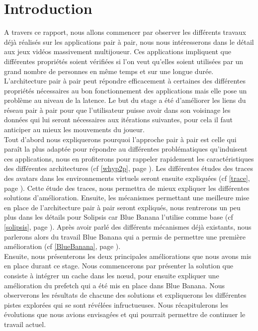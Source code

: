 \section{Introduction}
	A travers ce rapport, nous allons commencer par observer les différents travaux déjà réalisés sur les applications pair à pair, nous nous intéresserons dans le détail aux jeux vidéos massivement multijoueur. Ces applications impliquent que différentes propriétés soient vérifiées si l'on veut qu'elles soient utilisées par un grand nombre de personnes en même temps et sur une longue durée. L'architecture pair à pair peut répondre efficacement à certaines des différentes propriétés nécessaires au bon fonctionnement des applications mais elle pose un problème au niveau de la latence. Le but du stage a été d'améliorer les liens du réseau pair à pair pour que l'utilisateur puisse avoir dans son voisinage les données qui lui seront nécessaires aux itérations suivantes, pour cela il faut anticiper au mieux les mouvements du joueur.\\

	Tout d'abord nous expliquerons pourquoi l'approche pair à pair est celle qui paraît la plus adaptée pour répondre au différentes problématiques qu'induisent ces applications, nous en profiterons pour rappeler rapidement les caractéristiques des différentes architectures (cf \ref{whyp2p}, page \pageref{whyp2p}). Les différentes études des traces des avatars dans les environnements virtuels seront ensuite expliquées (cf \ref{trace}, page \pageref{trace}). Cette étude des traces, nous permettra de mieux expliquer les différentes solutions d'amélioration. Ensuite, les mécanismes permettant une meilleure mise en place de l'architecture pair à pair seront expliqués, nous rentrerons un peu plus dans les détails pour Solipsis car Blue Banana l'utilise comme base (cf \ref{solipsis}, page \pageref{solipsis}). Après avoir parlé des différents mécanismes déjà existants, nous parlerons alors du travail Blue Banana qui a permis de permettre une première amélioration (cf \ref{BlueBanana}, page \pageref{BlueBanana}). \\
	
	Ensuite, nous présenterons les deux principales améliorations que nous avons mis en place durant ce stage. Nous commencerons par présenter la solution que consiste à intégrer un cache dans les nœud, pour ensuite expliquer une amélioration du prefetch qui a été mis en place dans Blue Banana. Nous observerons les résultats de chacune des solutions et expliquerons les différentes pistes explorées qui se sont révélées infructueuses. Nous récapitulerons les évolutions que nous avions envisagées et qui pourrait permettre de continuer le travail actuel.

